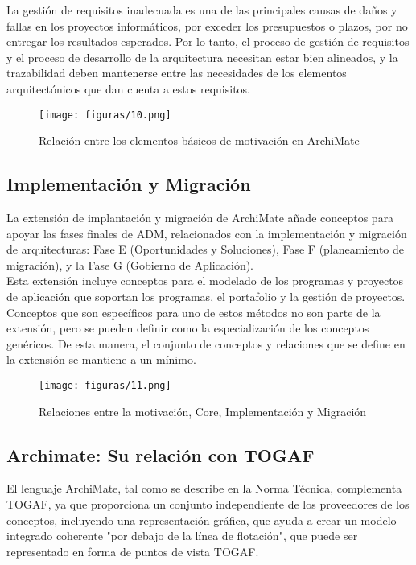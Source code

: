   La gestión de requisitos inadecuada es una de las principales causas de daños y fallas en los proyectos informáticos, por exceder los presupuestos o plazos, por no entregar los resultados esperados. Por lo tanto, el proceso de gestión de requisitos y el proceso de desarrollo de la arquitectura necesitan estar bien alineados, y la trazabilidad deben mantenerse entre las necesidades de los elementos arquitectónicos que dan cuenta a estos requisitos.
 
  \begin{figure}[!h]
   	\centering
   	\texttt{[image: figuras/10.png]}
   	\captionsetup{width=.95\textwidth}
   	\caption{Relación entre los elementos básicos de motivación en ArchiMate}
   	\label{figura10}
  \end{figure}
  
  \subsection{Implementación y Migración}
  La extensión de implantación y migración de ArchiMate añade conceptos para apoyar las fases finales de ADM, relacionados con la implementación y migración de arquitecturas: Fase E (Oportunidades y Soluciones), Fase F (planeamiento de migración), y la Fase G (Gobierno de Aplicación). \\
  
  Esta extensión incluye conceptos para el modelado de los programas y proyectos de aplicación que soportan los programas, el portafolio y la gestión de proyectos. Conceptos que son específicos para uno de estos métodos no son parte de la extensión, pero se pueden definir como la especialización de los conceptos genéricos. De esta manera, el conjunto de conceptos y relaciones que se define en la extensión se mantiene a un mínimo.

  \begin{figure}[!h]
  	\centering
   	\texttt{[image: figuras/11.png]}
   	\captionsetup{width=.95\textwidth}
   	\caption{Relaciones entre la motivación, Core, Implementación y Migración}
   	\label{figura11}
  \end{figure}

   \subsection{Archimate: Su relación con TOGAF}
   El lenguaje ArchiMate, tal como se describe en la Norma Técnica, complementa TOGAF, ya que proporciona un conjunto independiente de los proveedores de los conceptos, incluyendo una representación gráfica, que ayuda a crear un modelo integrado coherente "por debajo de la línea de flotación", que puede ser representado en forma de puntos de vista TOGAF. \\
   
